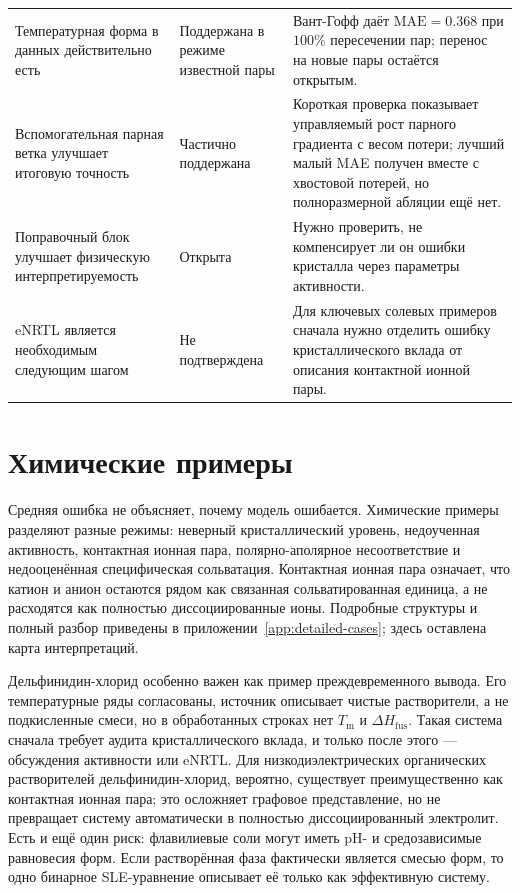 \documentclass[11pt]{article}
\newcommand{\mae}{\mathrm{MAE}}
\newcommand{\Tm}{T_{\mathrm m}}
\newcommand{\dHfus}{\Delta H_{\mathrm{fus}}}
\theoremstyle{definition}
\begin{document}
{\begin{longtable}{P{0.29\textwidth}P{0.20\textwidth}P{0.43\textwidth}}
Температурная форма в данных действительно есть & Поддержана в режиме известной пары & Вант-Гофф даёт $\mae=0.368$ при $100\%$ пересечении пар; перенос на новые пары остаётся открытым. \\
Вспомогательная парная ветка улучшает итоговую точность & Частично поддержана & Короткая проверка показывает управляемый рост парного градиента с весом потери; лучший малый MAE получен вместе с хвостовой потерей, но полноразмерной абляции ещё нет. \\
Поправочный блок улучшает физическую интерпретируемость & Открыта & Нужно проверить, не компенсирует ли он ошибки кристалла через параметры активности. \\
eNRTL является необходимым следующим шагом & Не подтверждена & Для ключевых солевых примеров сначала нужно отделить ошибку кристаллического вклада от описания контактной ионной пары. \\
\end{longtable}
}

\section{Химические примеры}

Средняя ошибка не объясняет, почему модель ошибается. Химические примеры разделяют разные режимы: неверный кристаллический уровень, недоученная активность, контактная ионная пара, полярно-аполярное несоответствие и недооценённая специфическая сольватация. Контактная ионная пара означает, что катион и анион остаются рядом как связанная сольватированная единица, а не расходятся как полностью диссоциированные ионы. Подробные структуры и полный разбор приведены в приложении~\ref{app:detailed-cases}; здесь оставлена карта интерпретаций.

Дельфинидин-хлорид особенно важен как пример преждевременного вывода. Его температурные ряды согласованы, источник описывает чистые растворители, а не подкисленные смеси, но в обработанных строках нет $\Tm$ и $\dHfus$. Такая система сначала требует аудита кристаллического вклада, и только после этого --- обсуждения активности или eNRTL. Для низкодиэлектрических органических растворителей дельфинидин-хлорид, вероятно, существует преимущественно как контактная ионная пара; это осложняет графовое представление, но не превращает систему автоматически в полностью диссоциированный электролит. Есть и ещё один риск: флавилиевые соли могут иметь pH- и средозависимые равновесия форм. Если растворённая фаза фактически является смесью форм, то одно бинарное SLE-уравнение описывает её только как эффективную систему.
\end{document}
